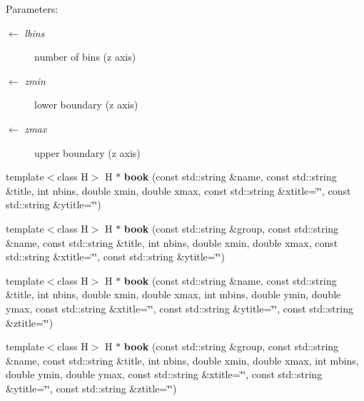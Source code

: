 \begin{Desc}
\item[Parameters:]
\begin{description}
\item[\mbox{$\leftarrow$} {\em lbins}]number of bins (z axis) \item[\mbox{$\leftarrow$} {\em zmin}]lower boundary (z axis) \item[\mbox{$\leftarrow$} {\em zmax}]upper boundary (z axis) \end{description}
\end{Desc}
\begin{CompactItemize}
\item 
\hypertarget{namespaceServices_1_1Histogramming_c003bf918d088168467d06a38f12386d}{
template$<$class H$>$ H $\ast$ \textbf{book} (const std::string \&name, const std::string \&title, int nbins, double xmin, double xmax, const std::string \&xtitle=\char`\"{}\char`\"{}, const std::string \&ytitle=\char`\"{}\char`\"{})}
\label{namespaceServices_1_1Histogramming_c003bf918d088168467d06a38f12386d}

\item 
\hypertarget{namespaceServices_1_1Histogramming_8a1d660c21b758e686ce2c0b966dbbfe}{
template$<$class H$>$ H $\ast$ \textbf{book} (const std::string \&group, const std::string \&name, const std::string \&title, int nbins, double xmin, double xmax, const std::string \&xtitle=\char`\"{}\char`\"{}, const std::string \&ytitle=\char`\"{}\char`\"{})}
\label{namespaceServices_1_1Histogramming_8a1d660c21b758e686ce2c0b966dbbfe}

\item 
\hypertarget{namespaceServices_1_1Histogramming_3c147b4125f432224490fa052c26309c}{
template$<$class H$>$ H $\ast$ \textbf{book} (const std::string \&name, const std::string \&title, int nbins, double xmin, double xmax, int mbins, double ymin, double ymax, const std::string \&xtitle=\char`\"{}\char`\"{}, const std::string \&ytitle=\char`\"{}\char`\"{}, const std::string \&ztitle=\char`\"{}\char`\"{})}
\label{namespaceServices_1_1Histogramming_3c147b4125f432224490fa052c26309c}

\item 
\hypertarget{namespaceServices_1_1Histogramming_8039512185d630acebb616b315bcd484}{
template$<$class H$>$ H $\ast$ \textbf{book} (const std::string \&group, const std::string \&name, const std::string \&title, int nbins, double xmin, double xmax, int mbins, double ymin, double ymax, const std::string \&xtitle=\char`\"{}\char`\"{}, const std::string \&ytitle=\char`\"{}\char`\"{}, const std::string \&ztitle=\char`\"{}\char`\"{})}
\label{namespaceServices_1_1Histogramming_8039512185d630acebb616b315bcd484}


\end{CompactItemize}

